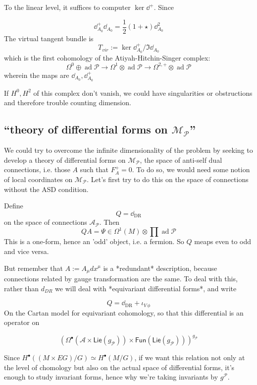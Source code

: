 \documentclass[leqno, openany]{memoir}
\theoremstyle{definition}
\theoremstyle{remark}
\theoremstyle{plain}
\theoremstyle{definition}
\theoremstyle{remark}
\newcommand{\mc}[1]{\mathcal{#1}}
\newcommand{\mr}[1]{\mathrm{#1}}
\newcommand{\ms}[1]{\mathsf{#1}}
\DeclareMathOperator{\ad}{ad}
\begin{document}
To the linear level, it suffices to computer $\ker \dd^{+}$. Since

\[
\dd^{+}_{A_{0}} \dd_{A_{0}} = \frac{1}{2} (1 + \star) \dd^{2}_{A_{0}}
\]
The virtual tangent bundle is
\[
T_{vir} := \ker \dd_{A_{0}}^{+}/\Im \dd_{A_{0}}
\]
which is the first cohomology of the Atiyah-Hitchin-Singer complex:
\[
\Omega^{0} \oplus \ad \mathcal{P} \to \Omega^{1} \otimes \ad \mathcal{P} \to \Omega^{2,+} \otimes \ad\mathcal{P}
\]
wherein the maps are $\dd_{A_{0}}, \dd_{A_{0}}^{+}$

If $H^{0},H^{2}$ of this complex don't vanish, we could have singularities or obstructions and therefore trouble counting dimension.



\subsection{``theory of differential forms on $\mathcal{M}_{\mathcal{P}}$''}
We could try to overcome the infinite dimensionality of the problem by seeking to develop a theory of differential forms on $\mathcal{M}_{\mathcal{P}}$, the space of anti-self dual connections, i.e. those $A$ such that $F_{A}^{+} = 0$. To do so, we would need some notion of local coordinates on $\mathcal{M}_{\mathcal{P}}$. Let's first try to do this on the space of connections without the ASD condition.

Define
\[
Q = \dd_{\mr{DR}}
\]
on the space of connections $\mathcal{A}_{\mathcal{P}}$.  Then
\[
QA = \Psi \in \Omega^{1}(M) \otimes \prod  \ad  \mc{P}
\]
This is a one-form, hence an 'odd' object, i.e. a fermion. So $Q$ meaps even to odd and vice versa.


But remember that $A := A_{\mu} dx^{\mu}$ is a *redundant* description, because connections related by gauge transformation are the same.  To deal with this, rather than $d_{DR}$ we will deal with *equivariant differential forms*, and write

\[
Q = \dd_{\mr{DR}} + \iota_{V\, \phi}
\]
On the Cartan model for equivariant cohomology, so that this differential is an operator on

\[
(\Omega^{\bullet} (\mathcal{A} \times \ms{Lie}(g_{\mathcal{P}})) \times \ms{Fun}(\ms{Lie}(g_{\mathcal{P}})))^{g_{\mathcal{P}}}
\]

Since $H^{\bullet}( (M \times EG)/G) \simeq H^{\bullet}(M/G)$, if we want this relation not only at the level of chomology but also on the actual space of differential forms, it's enough to study invariant forms, hence why we're taking invariants by $g^{\mathcal{P}}$.
\end{document}

